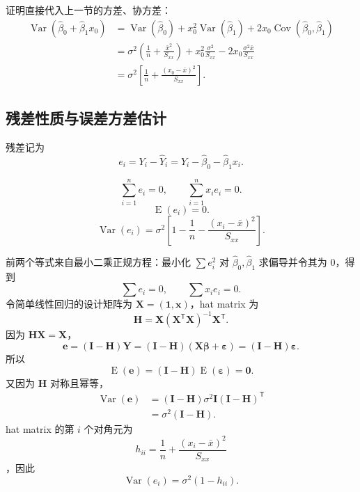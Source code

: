 \documentclass[11pt,a4paper]{article}
\theoremstyle{definition}
\theoremstyle{plain}
\theoremstyle{remark}
\newcommand{\E}{\operatorname{E}}
\newcommand{\Var}{\operatorname{Var}}
\newcommand{\Cov}{\operatorname{Cov}}
\begin{document}
证明直接代入上一节的方差、协方差：
\begin{align}
    \Var(\hat\beta_0+\hat\beta_1x_0)
    &=
    \Var(\hat\beta_0)+x_0^2\Var(\hat\beta_1)
    +2x_0\Cov(\hat\beta_0,\hat\beta_1)\\
    &=
    \sigma^2\left(\frac{1}{n}+\frac{\bar x^2}{S_{xx}}\right)
    +x_0^2\frac{\sigma^2}{S_{xx}}
    -2x_0\frac{\sigma^2\bar x}{S_{xx}}\\
    &=
    \sigma^2\left[
        \frac{1}{n}+\frac{(x_0-\bar x)^2}{S_{xx}}
    \right].
\end{align}

\subsection{残差性质与误差方差估计}

残差记为
\[
    e_i=Y_i-\hat Y_i=Y_i-\hat\beta_0-\hat\beta_1x_i.
\]

\begin{memorybox}
\[
    \boxed{\sum_{i=1}^n e_i=0,\qquad \sum_{i=1}^n x_ie_i=0.}
\]
\[
    \boxed{\E(e_i)=0.}
\]
\[
    \boxed{
    \Var(e_i)=
    \sigma^2\left[
        1-\frac{1}{n}-\frac{(x_i-\bar x)^2}{S_{xx}}
    \right].
    }
\]
\end{memorybox}

前两个等式来自最小二乘正规方程：最小化 $\sum e_i^2$ 对 $\hat\beta_0,\hat\beta_1$ 求偏导并令其为 0，得到
\[
    \sum e_i=0,\qquad \sum x_ie_i=0.
\]
令简单线性回归的设计矩阵为 $\boldsymbol X=(\boldsymbol1,\boldsymbol x)$，hat matrix 为
\[
    \boldsymbol H
    =
    \boldsymbol X(\boldsymbol X^{\mathsf T}\boldsymbol X)^{-1}
    \boldsymbol X^{\mathsf T}.
\]
因为 $\boldsymbol H\boldsymbol X=\boldsymbol X$，
\[
    \boldsymbol e
    =
    (\boldsymbol I-\boldsymbol H)\boldsymbol Y
    =
    (\boldsymbol I-\boldsymbol H)
    (\boldsymbol X\boldsymbol\beta+\boldsymbol\varepsilon)
    =
    (\boldsymbol I-\boldsymbol H)\boldsymbol\varepsilon.
\]
所以
\[
    \E(\boldsymbol e)
    =
    (\boldsymbol I-\boldsymbol H)\E(\boldsymbol\varepsilon)
    =
    \boldsymbol0.
\]
又因为 $\boldsymbol H$ 对称且幂等，
\begin{align}
    \Var(\boldsymbol e)
    &=
    (\boldsymbol I-\boldsymbol H)
    \sigma^2\boldsymbol I
    (\boldsymbol I-\boldsymbol H)^{\mathsf T}\\
    &=
    \sigma^2(\boldsymbol I-\boldsymbol H).
\end{align}
hat matrix 的第 $i$ 个对角元为
\[
    h_{ii}=\frac{1}{n}+\frac{(x_i-\bar x)^2}{S_{xx}}
\]
，因此
\[
    \Var(e_i)=\sigma^2(1-h_{ii}).
\]
\end{document}
